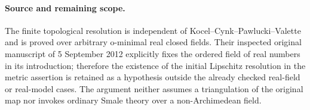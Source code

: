 \paragraph{Source and remaining scope.}
The finite topological resolution is independent of Kocel--Cynk--Pawlucki--Valette and is proved over arbitrary o-minimal real closed fields. Their inspected original manuscript of 5 September 2012 explicitly fixes the ordered field of real numbers in its introduction; therefore the existence of the initial Lipschitz resolution in the metric assertion is retained as a hypothesis outside the already checked real-field or real-model cases. The argument neither assumes a triangulation of the original map nor invokes ordinary Smale theory over a non-Archimedean field.
